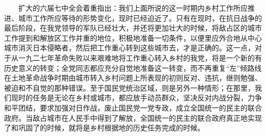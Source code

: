 \documentclass[cn,11pt,chinese]{elegantbook}
\begin{document}
　　扩大的六届七中全会着重指出：我们上面所说的这一时期内乡村工作所应推进、城市工作所应等待的形势变化，现时已经迫近了。只有在现时，在抗日战争的最后阶段，在我党领导的军队已经壮大，并还将更加壮大的时候，将敌占区的城市工作提到和解放区工作并重的地位，积极地准备一切条件，以便里应外合地从中心城市消灭日本侵略者，然后把工作重心转到这些城市去，才是正确的。这一点，对于从一九二七年革命失败以来艰难地将工作重心转入乡村的我党，将是一个新的有历史意义的转变；全党同志都应充分自觉地准备这一转变，而不再重复“左”倾路线在土地革命战争时期由城市转入乡村问题上所表现的初则反对、违抗，继则勉强、被迫和不自觉的那种错误。至于国民党统治区域，则是另外一种情形；在那里，我们现时的任务是无论在乡村或城市，都应放手动员群众，坚决反对内战分裂，力争和平团结，要求加强对日作战，废止国民党一党专政，成立全国统一的民主的联合政府。当敌占城市在人民手中得到了解放，全国统一的民主的联合政府真正地实现了和巩固了的时候，就将是乡村根据地的历史任务完成的时候。\\
\end{document}

